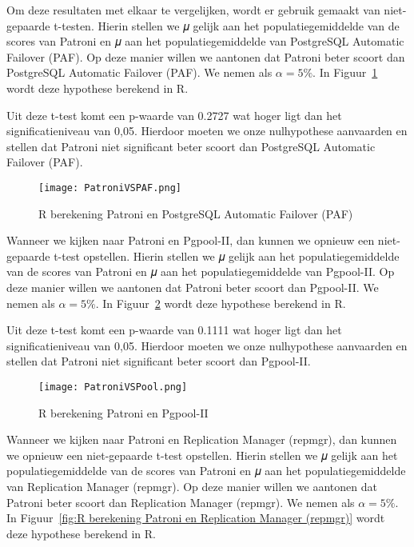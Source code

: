 Om deze resultaten met elkaar te vergelijken, wordt er gebruik gemaakt van niet-gepaarde t-testen. Hierin stellen we 𝜇 gelijk aan het populatiegemiddelde van de scores van Patroni en 𝜇 aan het populatiegemiddelde van PostgreSQL Automatic Failover (PAF). Op deze manier willen we aantonen dat Patroni beter scoort dan PostgreSQL Automatic Failover (PAF). We nemen als $\alpha = 5\%$. In Figuur~\ref{fig:R berekening Patroni en PostgreSQL Automatic Failover (PAF)} wordt deze hypothese berekend in R.

Uit deze t-test komt een p-waarde van 0.2727 wat hoger ligt dan het significatieniveau van 0,05. Hierdoor moeten we onze nulhypothese aanvaarden en stellen dat Patroni niet significant beter scoort dan PostgreSQL Automatic Failover (PAF). 

\begin{figure}[!h]
    \centering
    \texttt{[image: PatroniVSPAF.png]}
    \caption{R berekening Patroni en PostgreSQL Automatic Failover (PAF)}
    \label{fig:R berekening Patroni en PostgreSQL Automatic Failover (PAF)}
\end{figure}

Wanneer we kijken naar Patroni en Pgpool-II, dan kunnen we opnieuw een niet-gepaarde t-test opstellen. Hierin stellen we 𝜇 gelijk aan het populatiegemiddelde van de scores van Patroni en 𝜇 aan het populatiegemiddelde van Pgpool-II. Op deze manier willen we aantonen dat Patroni beter scoort dan Pgpool-II. We nemen als $\alpha = 5\%$. In Figuur~\ref{fig:R berekening Patroni en Pgpool-II} wordt deze hypothese berekend in R.

Uit deze t-test komt een p-waarde van 0.1111 wat hoger ligt dan het significatieniveau van 0,05. Hierdoor moeten we onze nulhypothese aanvaarden en stellen dat Patroni niet significant beter scoort dan Pgpool-II.

\begin{figure}[!h]
    \centering
    \texttt{[image: PatroniVSPool.png]}
    \caption{R berekening Patroni en Pgpool-II}
    \label{fig:R berekening Patroni en Pgpool-II}
\end{figure}

Wanneer we kijken naar Patroni en Replication Manager (repmgr), dan kunnen we opnieuw een niet-gepaarde t-test opstellen. Hierin stellen we 𝜇 gelijk aan het populatiegemiddelde van de scores van Patroni en 𝜇 aan het populatiegemiddelde van Replication Manager (repmgr). Op deze manier willen we aantonen dat Patroni beter scoort dan Replication Manager (repmgr). We nemen als $\alpha = 5\%$. In Figuur~\ref{fig:R berekening Patroni en Replication Manager (repmgr)} wordt deze hypothese berekend in R.

